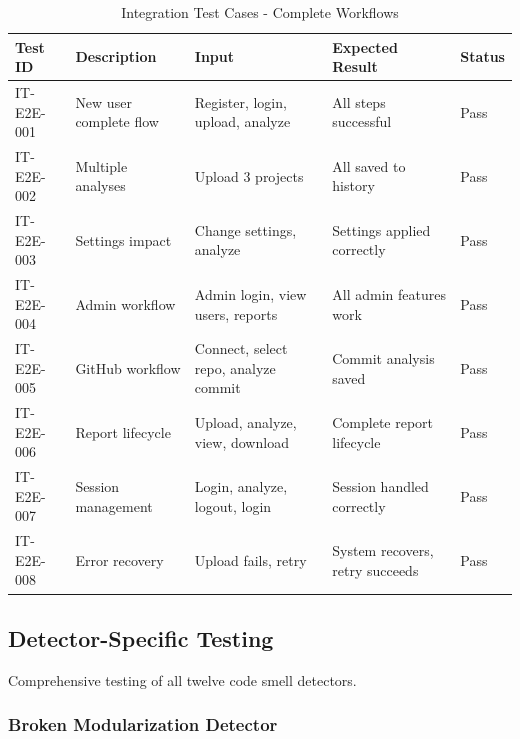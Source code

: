 \documentclass[12pt,a4paper]{article}
\begin{document}
    \begin{table}[H]
        \caption{Integration Test Cases - Complete Workflows}
        \begin{tabular}{|p{2cm}|p{4cm}|p{3cm}|p{3cm}|p{1.5cm}|}
            \hline
            \textbf{Test ID} & \textbf{Description} & \textbf{Input} & \textbf{Expected Result} & \textbf{Status} \\
            \hline
            IT-E2E-001 & New user complete flow & Register, login, upload, analyze & All steps successful & Pass \\
            \hline
            IT-E2E-002 & Multiple analyses & Upload 3 projects & All saved to history & Pass \\
            \hline
            IT-E2E-003 & Settings impact & Change settings, analyze & Settings applied correctly & Pass \\
            \hline
            IT-E2E-004 & Admin workflow & Admin login, view users, reports & All admin features work & Pass \\
            \hline
            IT-E2E-005 & GitHub workflow & Connect, select repo, analyze commit & Commit analysis saved & Pass \\
            \hline
            IT-E2E-006 & Report lifecycle & Upload, analyze, view, download & Complete report lifecycle & Pass \\
            \hline
            IT-E2E-007 & Session management & Login, analyze, logout, login & Session handled correctly & Pass \\
            \hline
            IT-E2E-008 & Error recovery & Upload fails, retry & System recovers, retry succeeds & Pass \\
            \hline
        \end{tabular}
    \end{table}

    \subsection{Detector-Specific Testing}

    Comprehensive testing of all twelve code smell detectors.

    \subsubsection{Broken Modularization Detector}
\end{document}

